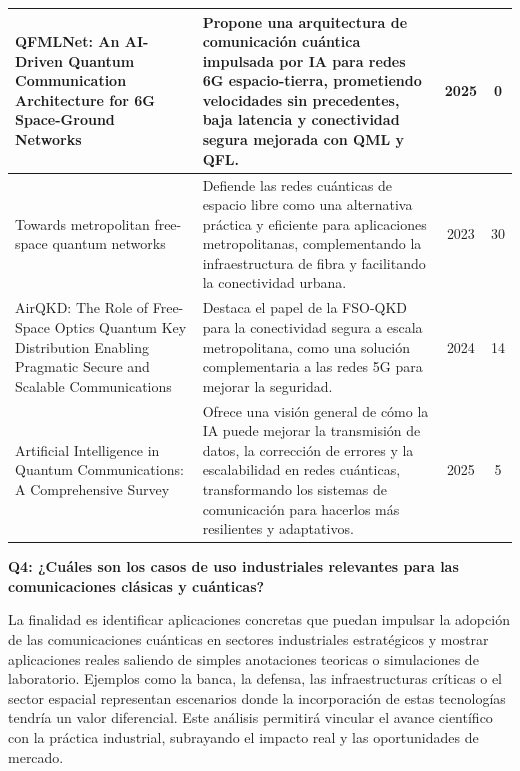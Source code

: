 \begin{longtable}{@{} p{4.5cm} p{6.5cm} c c @{}}
\hline
QFMLNet: An AI-Driven Quantum Communication Architecture for 6G Space-Ground Networks~\cite{Ding2025} & Propone una arquitectura de comunicación cuántica impulsada por IA para redes 6G espacio-tierra, prometiendo velocidades sin precedentes, baja latencia y conectividad segura mejorada con QML y QFL. & 2025 & 0 \\
\hline
Towards metropolitan free-space quantum networks~\cite{Krzic2023}& Defiende las redes cuánticas de espacio libre como una alternativa práctica y eficiente para aplicaciones metropolitanas, complementando la infraestructura de fibra y facilitando la conectividad urbana. & 2023 & 30 \\
\hline
AirQKD: The Role of Free-Space Optics Quantum Key Distribution Enabling Pragmatic Secure and Scalable Communications~\cite{Davidson2024} & Destaca el papel de la FSO-QKD para la conectividad segura a escala metropolitana, como una solución complementaria a las redes 5G para mejorar la seguridad. & 2024 & 14 \\
\hline
Artificial Intelligence in Quantum Communications: A Comprehensive Survey~\cite{Mahmud2025} & Ofrece una visión general de cómo la IA puede mejorar la transmisión de datos, la corrección de errores y la escalabilidad en redes cuánticas, transformando los sistemas de comunicación para hacerlos más resilientes y adaptativos. & 2025 & 5 \\
\end{longtable}

\vspace{1em} \textbf {Q4: ¿Cuáles son los casos de uso industriales relevantes para las comunicaciones clásicas y cuánticas?}

La finalidad es identificar aplicaciones concretas que puedan impulsar la adopción de las comunicaciones cuánticas en sectores industriales estratégicos y mostrar aplicaciones reales saliendo de simples anotaciones teoricas o simulaciones de laboratorio. Ejemplos como la banca, la defensa, las infraestructuras críticas o el sector espacial representan escenarios donde la incorporación de estas tecnologías tendría un valor diferencial. Este análisis permitirá vincular el avance científico con la práctica industrial, subrayando el impacto real y las oportunidades de mercado.

